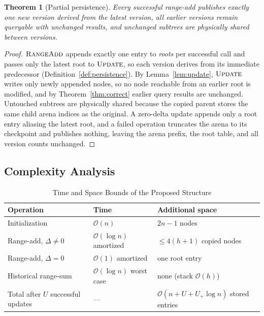 \documentclass[conference]{IEEEtran}
\newtheorem{theorem}{Theorem}
\begin{document}
\begin{theorem}[Partial persistence]
\label{thm:persist}
Every successful range-add publishes exactly one new version derived from the latest version, all
earlier versions remain queryable with unchanged results, and unchanged subtrees are physically
shared between versions.
\end{theorem}

\begin{proof}
$\textsc{RangeAdd}$ appends exactly one entry to \textit{roots} per successful call and passes
only the latest root to $\textsc{Update}$, so each version derives from its immediate
predecessor (Definition~\ref{def:persistence}). By Lemma~\ref{lem:update}, $\textsc{Update}$
writes only newly appended nodes, so no node reachable from an earlier root is modified, and by
Theorem~\ref{thm:correct} earlier query results are unchanged. Untouched subtrees are physically
shared because the copied parent stores the same child arena indices as the original. A
zero-delta update appends only a root entry aliasing the latest root, and a failed operation
truncates the arena to its checkpoint and publishes nothing, leaving the arena prefix, the root
table, and all version counts unchanged.
\end{proof}

\subsection{Complexity Analysis}
\label{sec:complexity}

\begin{table}[!t]
\caption{Time and Space Bounds of the Proposed Structure}
\label{tab:complexity}
\centering
\footnotesize
\renewcommand{\arraystretch}{1.25}
\begin{tabularx}{\columnwidth}{@{}p{2.7cm}p{2.1cm}X@{}}
\toprule
\textbf{Operation} & \textbf{Time} & \textbf{Additional space} \\
\midrule
Initialization & $\mathcal{O}(n)$ & $2n-1$ nodes \\
Range-add, $\Delta \neq 0$ & $\mathcal{O}(\log n)$ amortized & $\leq 4(h+1)$ copied nodes \\
Range-add, $\Delta = 0$ & $\mathcal{O}(1)$ amortized & one root entry \\
Historical range-sum & $\mathcal{O}(\log n)$ worst case & none (stack $\mathcal{O}(h)$) \\
Total after $U$ successful updates & --- &
$\mathcal{O}(n+U+U_{+}\log n)$ stored entries \\
\bottomrule
\end{tabularx}
\end{table}
\end{document}
